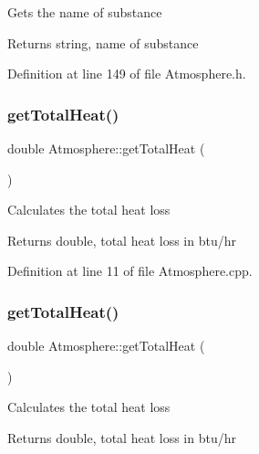 Gets the name of substance \begin{DoxyReturn}{Returns}
string, name of substance 
\end{DoxyReturn}


Definition at line 149 of file Atmosphere.\+h.

\mbox{\label{class_atmosphere_ad3dd28020262aee76d374cbfb7998e46}} 
\subsubsection{\texorpdfstring{get\+Total\+Heat()}{getTotalHeat()}\hspace{0.1cm}{\footnotesize\ttfamily [1/3]}}
{\footnotesize\ttfamily double Atmosphere\+::get\+Total\+Heat (\begin{DoxyParamCaption}{ }\end{DoxyParamCaption})}

Calculates the total heat loss \begin{DoxyReturn}{Returns}
double, total heat loss in btu/hr 
\end{DoxyReturn}


Definition at line 11 of file Atmosphere.\+cpp.

\mbox{\label{class_atmosphere_ad3dd28020262aee76d374cbfb7998e46}} 
\subsubsection{\texorpdfstring{get\+Total\+Heat()}{getTotalHeat()}\hspace{0.1cm}{\footnotesize\ttfamily [2/3]}}
{\footnotesize\ttfamily double Atmosphere\+::get\+Total\+Heat (\begin{DoxyParamCaption}{ }\end{DoxyParamCaption})}

Calculates the total heat loss \begin{DoxyReturn}{Returns}
double, total heat loss in btu/hr 
\end{DoxyReturn}
\mbox{\label{class_atmosphere_ad3dd28020262aee76d374cbfb7998e46}} 
